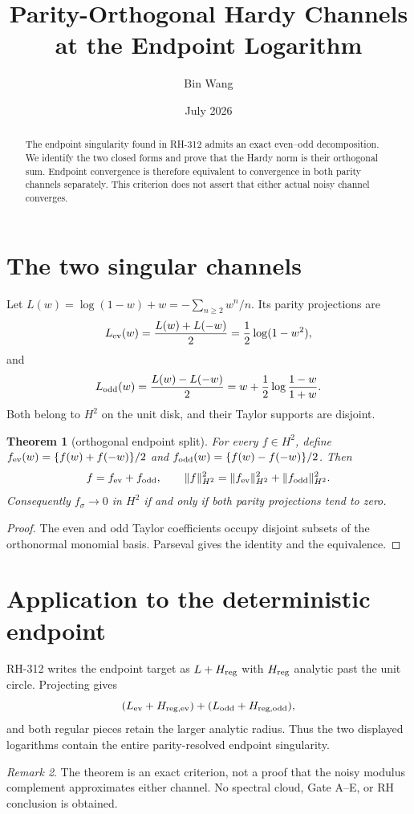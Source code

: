 \documentclass[11pt]{article}
\title{Parity-Orthogonal Hardy Channels at the Endpoint Logarithm}
\author{Bin Wang}\date{July 2026}
\newtheorem{theorem}{Theorem}[section]
\theoremstyle{remark}\newtheorem{remark}[theorem]{Remark}
\begin{document}
\maketitle
\begin{abstract}
The endpoint singularity found in RH-312 admits an exact even--odd
decomposition.  We identify the two closed forms and prove that the Hardy
norm is their orthogonal sum.  Endpoint convergence is therefore equivalent
to convergence in both parity channels separately.  This criterion does not
assert that either actual noisy channel converges.
\end{abstract}

\section{The two singular channels}
Let $L(w)=\log(1-w)+w=-\sum_{n\ge2}w^n/n$.  Its parity projections are
\[
 L_{\rm ev}(w)=\frac{L(w)+L(-w)}2=\frac12\log(1-w^2),
\]
and
\[
 L_{\rm odd}(w)=\frac{L(w)-L(-w)}2
 =w+\frac12\log\frac{1-w}{1+w}.
\]
Both belong to $H^2$ on the unit disk, and their Taylor supports are disjoint.

\begin{theorem}[orthogonal endpoint split]
For every $f\in H^2$, define
$f_{\rm ev}(w)=\{f(w)+f(-w)\}/2$ and
$f_{\rm odd}(w)=\{f(w)-f(-w)\}/2$.  Then
\[
 f=f_{\rm ev}+f_{\rm odd},\qquad
 \|f\|_{H^2}^2=\|f_{\rm ev}\|_{H^2}^2+
 \|f_{\rm odd}\|_{H^2}^2.
\]
Consequently $f_\sigma\to0$ in $H^2$ if and only if both parity projections
tend to zero.
\end{theorem}
\begin{proof}
The even and odd Taylor coefficients occupy disjoint subsets of the
orthonormal monomial basis.  Parseval gives the identity and the equivalence.
\end{proof}

\section{Application to the deterministic endpoint}
RH-312 writes the endpoint target as
$L+H_{\rm reg}$ with $H_{\rm reg}$ analytic past the unit circle.  Projecting
gives
\[
 (L_{\rm ev}+H_{{\rm reg},{\rm ev}})
 +(L_{\rm odd}+H_{{\rm reg},{\rm odd}}),
\]
and both regular pieces retain the larger analytic radius.  Thus the two
displayed logarithms contain the entire parity-resolved endpoint
singularity.

\begin{remark}
The theorem is an exact criterion, not a proof that the noisy modulus
complement approximates either channel.  No spectral cloud, Gate A--E, or RH
conclusion is obtained.
\end{remark}
\end{document}
